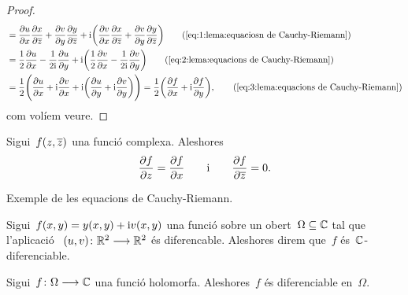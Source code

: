 \documentclass[../Apunts.tex]{subfiles}
\begin{document}
\begin{proof}
\begin{align*}
            &=\frac{\partial u}{\partial x}\frac{\partial x}{\partial\conjugat{z}}
            +\frac{\partial v}{\partial y}\frac{\partial y}{\partial\conjugat{z}}
            +\iu\biggl(\frac{\partial v}{\partial x}\frac{\partial x}{\partial\conjugat{z}}
            +\frac{\partial v}{\partial y}\frac{\partial y}{\partial\conjugat{z}}\biggr)
            \tag{\ref{eq:1:lema:equaciosn de Cauchy-Riemann}}\\
            &=\frac{1}{2}\frac{\partial u}{\partial x}
            -\frac{1}{2\iu}\frac{\partial u}{\partial y}
            +\iu\biggl(\frac{1}{2}\frac{\partial v}{\partial x}
            -\frac{1}{2\iu}\frac{\partial v}{\partial y}\biggr)
            \tag{\ref{eq:2:lema:equacions de Cauchy-Riemann}}\\
            &=\frac{1}{2}\Biggl(\frac{\partial u}{\partial x}
            +\iu\frac{\partial v}{\partial x}+\iu\biggl(\frac{\partial u}{\partial y}
            +\iu\frac{\partial v}{\partial y}\biggr)\Biggr)
            =\frac{1}{2}\biggl(\frac{\partial f}{\partial x}
            +\iu\frac{\partial f}{\partial y}\biggr),
            \tag{\ref{eq:3:lema:equacions de Cauchy-Riemann}}
        \end{align*}
        com volíem veure.
    \end{proof}
    \begin{observation}
        Sigui~\(f(z,\overline{z})\) una funció complexa.
        Aleshores
        \[
            \frac{\partial f}{\partial z}=\frac{\partial f}{\partial x}
            \qquad\text{i}\qquad
            \frac{\partial f}{\partial\overline{z}}=0.
        \]
    \end{observation}
    \begin{example}
        Exemple de les equacions de Cauchy-Riemann.
    \end{example}
    \begin{solution}
    \end{solution}
    \begin{definition}
        \label{def:C-diferenciable}
        Sigui~\(f(x,y)=y(x,y)+\mathrm{i} v(x,y)\) una funció sobre un
        obert~\(\Omega\subseteq\mathbb{C}\) tal que l'aplicació%
        ~\((u,v)\colon\mathbb{R}^{2}\longrightarrow\mathbb{R}^{2}\) és diferencable.
        Aleshores direm que~\(f\) és~\(\mathbb{C}\)-diferenciable.
    \end{definition}
    \begin{proposition}
        \label{prop:les funcions holomorfes són funcions diferenciables}
        Sigui~\(f\colon\Omega\longrightarrow\mathbb{C}\) una funció holomorfa.
        Aleshores~\(f\) és diferenciable en~\(\Omega\).
    \end{proposition}
\end{document}
